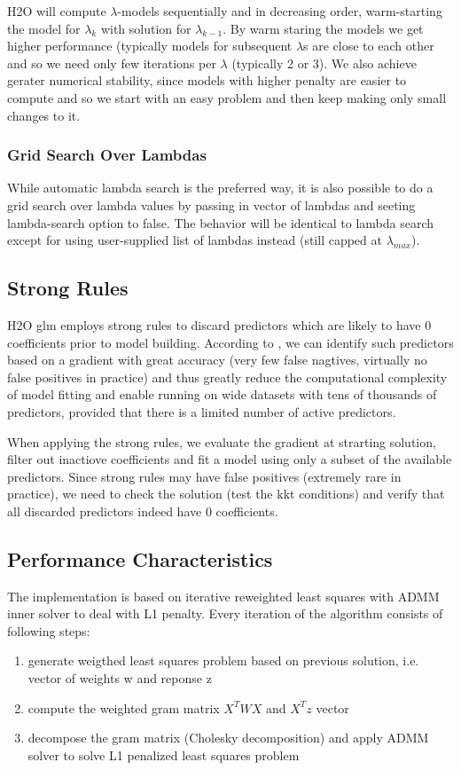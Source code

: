 \documentclass[11pt]{article}
\begin{document}
H2O will compute $\lambda$-models sequentially and in decreasing order, warm-starting the model for $\lambda_k$ with solution for $\lambda_{k-1}$. By warm staring the models we get higher performance (typically models for subsequent $\lambda$s are close to each other and so we need only few iterations per $\lambda$ (typically 2 or 3). We also achieve gerater numerical stability, since models with higher penalty are easier to compute and so we start with an easy problem and then keep making only small changes to it.
    
\subsubsection{Grid Search Over Lambdas}
While automatic lambda search is the preferred way, it is also possible to do a grid search over lambda values by passing in vector of lambdas and seeting lambda-search option to false. The behavior will be identical to lambda search except for using user-supplied list of lambdas instead (still capped at $\lambda_{max}$).

\subsection{Strong Rules} %
H2O glm employs strong rules \cite{strong} to discard predictors which are likely to have 0 coefficients prior to model building. According to \cite{strong}, we can identify such predictors based on a gradient with great accuracy (very few false nagtives, virtually no false positives in practice) and thus greatly reduce the computational complexity of model fitting and enable running on wide datasets with tens of thousands of predictors, provided that there is a limited number of active predictors. 

When applying the strong rules, we evaluate the gradient at strarting solution, filter out inactiove coefficients and fit a model using only a subset of the available predictors. Since strong rules may have false positives (extremely rare in practice), we need to check the solution (test the kkt conditions) and verify that all discarded predictors indeed have 0 coefficients.  

\subsection{Performance Characteristics}
The implementation is based on iterative reweighted least squares with ADMM \cite{admm} inner solver to deal with L1 penalty. Every iteration of the algorithm consists of following steps:
\begin{enumerate} 
\item generate weigthed least squares problem based on previous solution, i.e. vector of weights w and reponse z 
\item compute the weighted gram matrix $X^TWX$ and $X^Tz$ vector
\item decompose the gram matrix (Cholesky decomposition) and apply ADMM solver to solve L1 penalized least squares problem
\end{enumerate}
\end{document}

